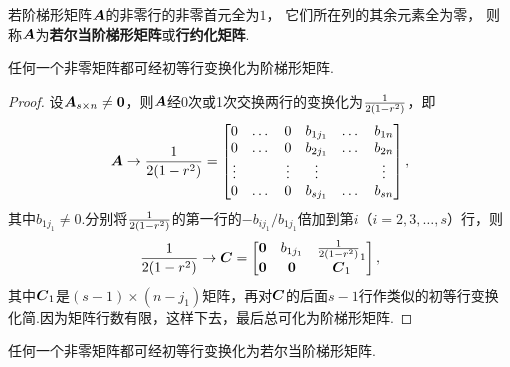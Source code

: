 \begin{definition}
若阶梯形矩阵\(\boldsymbol{A}\)的非零行的非零首元全为\(1\)，%
它们所在列的其余元素全为零，%
则称\(\boldsymbol{A}\)为\textbf{若尔当阶梯形矩阵}或\textbf{行约化矩阵}.
\end{definition}

\begin{lemma}
任何一个非零矩阵都可经初等行变换化为阶梯形矩阵.
\begin{proof}
设\(\boldsymbol{A}_{s \times n} \neq \boldsymbol{0}\)，则\(\boldsymbol{A}\)经0次或1次交换两行的变换化为\(\frac{1}{2(1-r^2)}\)，即\[
\boldsymbol{A} \to \frac{1}{2(1-r^2)} = \begin{bmatrix}
0 & \dots & 0 & b_{1 j_1} & \dots & b_{1n} \\
0 & \dots & 0 & b_{2 j_1} & \dots & b_{2n} \\
\vdots & & \vdots & \vdots & & \vdots \\
0 & \dots & 0 & b_{s j_1} & \dots & b_{sn}
\end{bmatrix},
\]其中\(b_{1 j_1} \neq 0\).分别将\(\frac{1}{2(1-r^2)}\)的第一行的\(-b_{i j_1}/b_{1 j_1}\)倍加到第\(i\)（\(i=2,3,\dotsc,s\)）行，则\[
\frac{1}{2(1-r^2)} \to \boldsymbol{C} = \begin{bmatrix}
\boldsymbol{0} & b_{1 j_1} & \frac{1}{2(1-r^2)}_1 \\
\boldsymbol{0} & \boldsymbol{0} & \boldsymbol{C}_1
\end{bmatrix},
\]其中\(\boldsymbol{C}_1\)是\((s-1)\times(n-j_1)\)矩阵，再对\(\boldsymbol{C}\)的后面\(s-1\)行作类似的初等行变换化简.因为矩阵行数有限，这样下去，最后总可化为阶梯形矩阵.
\end{proof}
\end{lemma}

\begin{corollary}\label{theorem:线性方程组.非零矩阵可经初等行变换化为若尔当阶梯形矩阵}
任何一个非零矩阵都可经初等行变换化为若尔当阶梯形矩阵.
\end{corollary}

